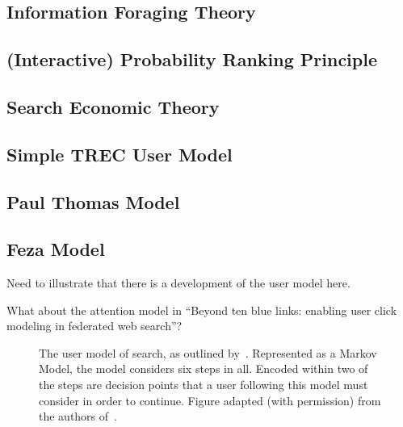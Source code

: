\subsection{Information Foraging Theory}

\subsection{(Interactive) Probability Ranking Principle}

\subsection{Search Economic Theory}

\subsection{Simple TREC User Model}

\subsection{Paul Thomas Model}

\subsection{Feza Model}

Need to illustrate that there is a development of the user model here.

What about the attention model in ``Beyond ten blue links: enabling user click modeling in federated web search''?

\begin{figure}[t!]
    \centering
    \caption[Model of the search process by~\cite{baskaya2013behavioural_factors}]{The user model of search, as outlined by~\citealt{baskaya2013behavioural_factors}. Represented as a Markov Model, the model considers six steps in all. Encoded within two of the steps are decision points that a user following this model must consider in order to continue. Figure adapted (with permission) from the authors of~\citealt{baskaya2013behavioural_factors}.}
    \label{fig:baskaya_model}
\end{figure}

